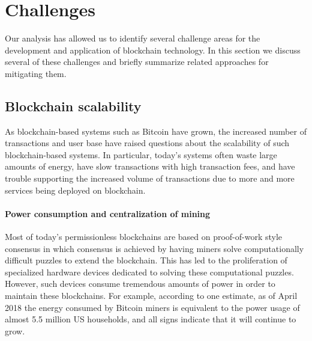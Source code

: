 
\section{Challenges}
\label{sec:challenges}


Our analysis has allowed us to identify several challenge areas for the development and application of blockchain technology.  In this section we discuss several of these challenges and briefly summarize related approaches for mitigating them.

\subsection{Blockchain scalability}
As blockchain-based systems such as Bitcoin have grown, the increased number of transactions and user base have raised questions about the scalability of such blockchain-based systems.  In particular, today's systems often waste large amounts of energy, have slow transactions with high transaction fees, and have trouble supporting the increased volume of transactions due to more and more services being deployed on blockchain.

\paragraph{Power consumption and centralization of mining}
Most of today's permissionless blockchains are based on proof-of-work style consensus in which consensus is achieved by having miners solve computationally difficult puzzles to extend the blockchain.  This has led to the proliferation of specialized hardware devices dedicated to solving these computational puzzles.  However, such devices consume tremendous amounts of power in order to maintain these blockchains.  For example, according to one estimate\cite{Digiconomist}, as of April 2018 the energy consumed by Bitcoin miners is equivalent to the power usage of almost 5.5 million US households, and all signs indicate that it will continue to grow.

